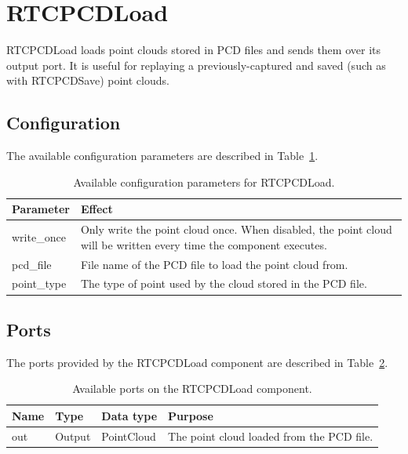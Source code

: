 \documentclass[a4paper,10pt]{article}
\begin{document}
\section{RTCPCDLoad}
\label{sec:rtcpcdload}

RTCPCDLoad loads point clouds stored in PCD files and sends them over its
output port. It is useful for replaying a previously-captured and saved (such
as with RTCPCDSave) point clouds.

\subsection{Configuration}
\label{sec1:pcdload_configuration}

The available configuration parameters are described in
Table~\ref{tab:pcdload_config_params}.

\begin{table}[t]
  \centering
  \begin{tabularx}{\columnwidth}{lX}
    \toprule
    Parameter & Effect \\
    \midrule
    write\_once & Only write the point cloud once. When disabled, the point cloud will be written every time the component executes. \\
    pcd\_file & File name of the PCD file to load the point cloud from. \\
    point\_type & The type of point used by the cloud stored in the PCD file. \\
    \bottomrule
  \end{tabularx}
  \caption{Available configuration parameters for RTCPCDLoad.}
  \label{tab:pcdload_config_params}
\end{table}

\subsection{Ports}
\label{sec1:pcdload_port}

The ports provided by the RTCPCDLoad component are described in Table~\ref{tab:pcdload_ports}.

\begin{table}[t]
  \centering
  \begin{tabularx}{\columnwidth}{lllX}
    \toprule
    Name & Type & Data type & Purpose \\
    \midrule
    out & Output & PointCloud & The point cloud loaded from the PCD file. \\
    \bottomrule
  \end{tabularx}
  \caption{Available ports on the RTCPCDLoad component.}
  \label{tab:pcdload_ports}
\end{table}
\end{document}
